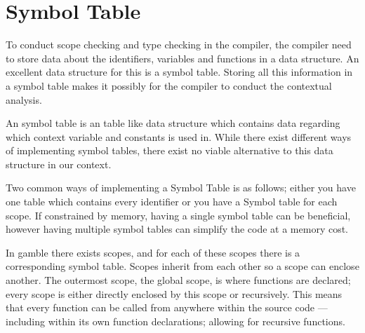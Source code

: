 \section{Symbol Table}
To conduct scope checking and type checking in the compiler, the compiler need to store data about the identifiers, variables and functions in a data structure.
An excellent data structure for this is a symbol table.
Storing all this information in a symbol table makes it possibly for the compiler to conduct the contextual analysis.

An symbol table is an table like data structure which contains data regarding which context variable and constants is used in.
While there exist different ways of implementing symbol tables, there exist no viable alternative to this data structure in our context.

Two common ways of implementing a Symbol Table is as follows; either you have one table which contains every identifier or you have a Symbol table for each scope. 
If constrained by memory, having a single symbol table can be beneficial, however having multiple symbol tables can simplify the code at a memory cost. 

In \gls{gamble} there exists scopes, and for each of these scopes there is a corresponding symbol table. 
Scopes inherit from each other so a scope can enclose another. 
The outermost scope, the global scope, is where functions are declared; every scope is either directly enclosed by this scope or recursively.
This means that every function can be called from anywhere within the source code --- including within its own function declarations; allowing for recursive functions.


